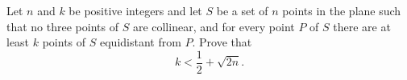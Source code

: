 Let $n$ and $k$ be positive integers and let $S$ be a set of $n$ points in the plane such that no three points of $S$ are collinear, and for every point $P$ of $S$ there are at least $k$ points of $S$ equidistant from $P$. Prove that \[ k < \frac {1}{2} + \sqrt {2n}.\]
